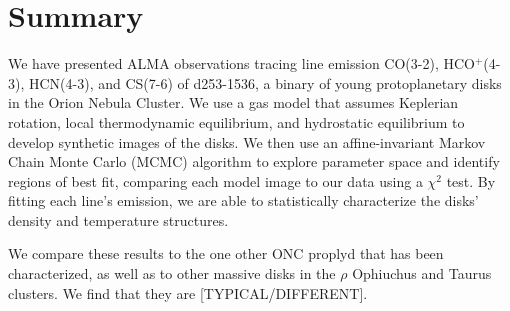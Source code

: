 \chapter{Summary}
\label{chap:Summary}


We have presented ALMA observations tracing line emission CO(3-2), HCO$^+$(4-3), HCN(4-3), and CS(7-6) of d253-1536, a binary of young protoplanetary disks in the Orion Nebula Cluster. We use a gas model that assumes Keplerian rotation, local thermodynamic equilibrium, and hydrostatic equilibrium to develop synthetic images of the disks. We then use an affine-invariant Markov Chain Monte Carlo (MCMC) algorithm to explore parameter space and identify regions of best fit, comparing each model image to our data using a $\chi^2$ test. By fitting each line's emission, we are able to statistically characterize the disks' density and temperature structures.


We compare these results to the one other ONC proplyd that has been characterized, as well as to other massive disks in the $\rho$ Ophiuchus and Taurus clusters. We find that they are [TYPICAL/DIFFERENT].
